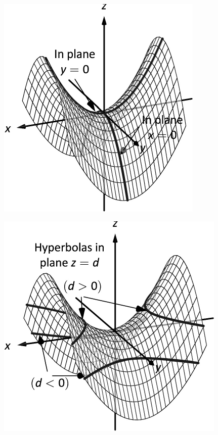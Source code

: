 \documentclass[10pt]{article}
\begin{document}
\includegraphics{figquadric_hyp_parb_3DBW.pdf}
\texttt{}

\includegraphics{figquadric_hyp_parc_3DBW.pdf}
\texttt{}
\end{document}
